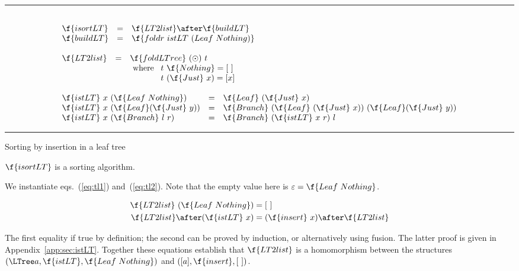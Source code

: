 \documentclass[a4paper,11pt]{llncs}
\begin{document}
\begin{table}[tb]
\hrule
$$
\begin{array}{l}\\
\begin{array}{lcl}
\f{isortLT}  & = & \f{LT2list} \after \f{buildLT}\\ 
\f{buildLT} & = & \f{foldr\ istLT\ (Leaf\ Nothing)}
\end{array}
\\ \\
\begin{array}{lcl}
\f{LT2list} & = & \f{foldLTree}\ (\odot)\ t\\
&& \mbox{ where } 
\begin{array}[t]{l}
t\ \f{Nothing} = [\ ]\\
t\ (\f{Just}\ x) = [x]
\end{array}\\
\end{array}
\\ \\
\begin{array}{lcl}
  \f{istLT}\ x\ (\f{Leaf\ Nothing}) & = &  \f{Leaf}\ (\f{Just}\ x)\\
  \f{istLT}\ x\ (\f{Leaf} (\f{Just}\ y)) & = &  \f{Branch}\ (\f{Leaf}\
  (\f{Just}\ x))\ (\f{Leaf} (\f{Just}\ y))\\
  \f{istLT}\ x\ (\f{Branch}\ l\  r) & = & \f{Branch}\ (\f{istLT}\ x\ r)\
  l
\end{array}
\end{array}
$$
\hrule
\caption{Sorting by insertion in a leaf tree}
\label{tab:sortinsertLT}
\end{table}


\begin{proposition} \label{prop:P1}
$\f{isortLT}$ is a sorting algorithm.
\end{proposition}

\proof
We instantiate eqs.~(\ref{eq:tl1}) and~(\ref{eq:tl2}). Note that
the empty value here is $\varepsilon = \f{Leaf\ Nothing}$.

\begin{align*}
\f{LT2list}\ (\f{Leaf\ Nothing}) & = [\ ]\\
\f{LT2list} \after (\f{istLT}\ x) & = (\f{insert}\ x)
  \after \f{LT2list} \\
\end{align*}


The first equality if true by definition; the second can be proved by
induction, or alternatively using fusion. The latter proof is given in
Appendix~\ref{app:sec:istLT}. Together these equations establish that
$\f{LT2list}$ is a homomorphism between the structures $(\LTree a,
\f{istLT}, \f{Leaf\ Nothing})$ and $([a],\f{insert},[\ ])$.
\endproof
\end{document}
